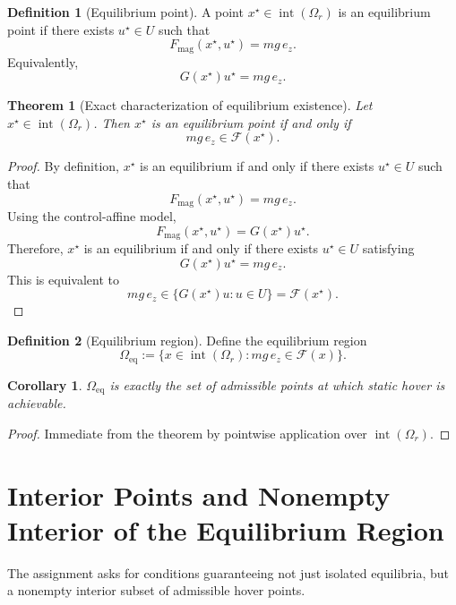 \documentclass[11pt]{article}
\newtheorem{theorem}{Theorem}
\newtheorem{corollary}{Corollary}
\theoremstyle{definition}
\newtheorem{definition}{Definition}
\begin{document}
\begin{definition}[Equilibrium point]
A point \(x^\star \in \operatorname{int}(\Omega_r)\) is an equilibrium point if there exists \(u^\star \in U\) such that
\[
F_{\mathrm{mag}}(x^\star,u^\star) = mg\,e_z.
\]
Equivalently,
\[
G(x^\star)u^\star = mg\,e_z.
\]
\end{definition}

\begin{theorem}[Exact characterization of equilibrium existence]
Let \(x^\star \in \operatorname{int}(\Omega_r)\). Then \(x^\star\) is an equilibrium point if and only if
\[
mg\,e_z \in \mathcal{F}(x^\star).
\]
\end{theorem}

\begin{proof}
By definition, \(x^\star\) is an equilibrium if and only if there exists \(u^\star \in U\) such that
\[
F_{\mathrm{mag}}(x^\star,u^\star)=mg\,e_z.
\]
Using the control-affine model,
\[
F_{\mathrm{mag}}(x^\star,u^\star)=G(x^\star)u^\star.
\]
Therefore, \(x^\star\) is an equilibrium if and only if there exists \(u^\star \in U\) satisfying
\[
G(x^\star)u^\star = mg\,e_z.
\]
This is equivalent to
\[
mg\,e_z \in \{G(x^\star)u : u\in U\} = \mathcal{F}(x^\star).
\]
\end{proof}

\begin{definition}[Equilibrium region]
Define the equilibrium region
\[
\Omega_{\mathrm{eq}}
:=
\{x \in \operatorname{int}(\Omega_r) : mg\,e_z \in \mathcal{F}(x)\}.
\]
\end{definition}

\begin{corollary}
\(\Omega_{\mathrm{eq}}\) is exactly the set of admissible points at which static hover is achievable.
\end{corollary}

\begin{proof}
Immediate from the theorem by pointwise application over \(\operatorname{int}(\Omega_r)\).
\end{proof}

\section{Interior Points and Nonempty Interior of the Equilibrium Region}

The assignment asks for conditions guaranteeing not just isolated equilibria, but a nonempty interior subset of admissible hover points.
\end{document}
